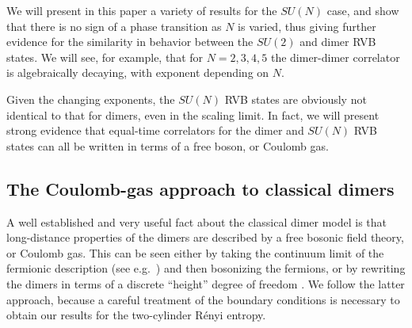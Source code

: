 \documentclass[11pt]{iopart}
\begin{document}
We will present in this paper a variety of results for the $SU(N)$ case, and show that there is no sign of a phase transition as $N$ is varied, thus giving further evidence for the similarity in behavior between the  $SU(2)$ and dimer RVB states. We will see, for example, that for $N=2,3,4,5$ the dimer-dimer correlator is algebraically decaying, with exponent depending on $N$.

Given the changing exponents, the $SU(N)$ RVB states are obviously not identical to that for dimers, even in the scaling limit. In fact, we will present strong evidence that equal-time correlators for the dimer and $SU(N)$ RVB states can all be written in terms of a free boson, or Coulomb gas. 

\subsection{The Coulomb-gas approach to classical dimers}
\label{sec:cg}

A well established and very useful fact about the classical dimer model is that long-distance properties of the dimers are described by a free bosonic field theory, or Coulomb gas. This can be seen either by taking the continuum limit of the fermionic description (see e.g.\ \cite{FMS}) and then bosonizing the fermions, or by rewriting the dimers in terms of a discrete ``height'' degree of freedom \cite{Heights_1,Heights_2,Henley}. We follow the latter approach, because a careful treatment of the boundary conditions is necessary to obtain our results for the two-cylinder R\'enyi entropy. 
\end{document}

